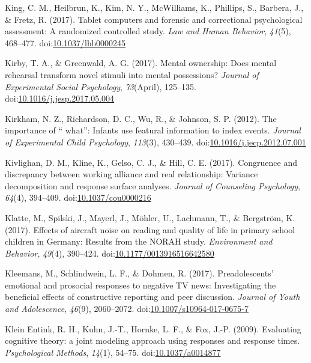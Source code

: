 \documentclass[english,man]{apa6}
\begin{document}
\hypertarget{ref-King2017a}{}
King, C. M., Heilbrun, K., Kim, N. Y., McWilliams, K., Phillips, S.,
Barbera, J., \& Fretz, R. (2017). Tablet computers and forensic and
correctional psychological assessment: A randomized controlled study.
\emph{Law and Human Behavior}, \emph{41}(5), 468--477.
doi:\href{https://doi.org/10.1037/lhb0000245}{10.1037/lhb0000245}

\hypertarget{ref-Kirby2017}{}
Kirby, T. A., \& Greenwald, A. G. (2017). Mental ownership: Does mental
rehearsal transform novel stimuli into mental possessions? \emph{Journal
of Experimental Social Psychology}, \emph{73}(April), 125--135.
doi:\href{https://doi.org/10.1016/j.jesp.2017.05.004}{10.1016/j.jesp.2017.05.004}

\hypertarget{ref-Kirkham2012}{}
Kirkham, N. Z., Richardson, D. C., Wu, R., \& Johnson, S. P. (2012). The
importance of `` what'': Infants use featural information to index
events. \emph{Journal of Experimental Child Psychology}, \emph{113}(3),
430--439.
doi:\href{https://doi.org/10.1016/j.jecp.2012.07.001}{10.1016/j.jecp.2012.07.001}

\hypertarget{ref-Kivlighan2017}{}
Kivlighan, D. M., Kline, K., Gelso, C. J., \& Hill, C. E. (2017).
Congruence and discrepancy between working alliance and real
relationship: Variance decomposition and response surface analyses.
\emph{Journal of Counseling Psychology}, \emph{64}(4), 394--409.
doi:\href{https://doi.org/10.1037/cou0000216}{10.1037/cou0000216}

\hypertarget{ref-Klatte2017}{}
Klatte, M., Spilski, J., Mayerl, J., Möhler, U., Lachmann, T., \&
Bergström, K. (2017). Effects of aircraft noise on reading and quality
of life in primary school children in Germany: Results from the NORAH
study. \emph{Environment and Behavior}, \emph{49}(4), 390--424.
doi:\href{https://doi.org/10.1177/0013916516642580}{10.1177/0013916516642580}

\hypertarget{ref-Kleemans2017}{}
Kleemans, M., Schlindwein, L. F., \& Dohmen, R. (2017). Preadolescents'
emotional and prosocial responses to negative TV news: Investigating the
beneficial effects of constructive reporting and peer discussion.
\emph{Journal of Youth and Adolescence}, \emph{46}(9), 2060--2072.
doi:\href{https://doi.org/10.1007/s10964-017-0675-7}{10.1007/s10964-017-0675-7}

\hypertarget{ref-KleinEntink2009}{}
Klein Entink, R. H., Kuhn, J.-T., Hornke, L. F., \& Fox, J.-P. (2009).
Evaluating cognitive theory: a joint modeling approach using responses
and response times. \emph{Psychological Methods}, \emph{14}(1), 54--75.
doi:\href{https://doi.org/10.1037/a0014877}{10.1037/a0014877}
\end{document}
